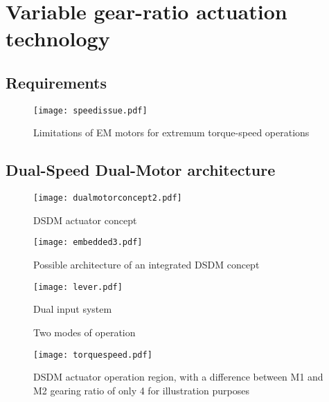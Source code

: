 \chapter{Variable gear-ratio actuation technology}
\label{sec:MultipleSpeedActuationTechnology}

\section{Requirements}
\label{sec:Requirements}

\begin{figure}[H]
	\centering
		\texttt{[image: speedissue.pdf]}
	\caption{Limitations of EM motors for extremum torque-speed operations}
	\label{fig:speedissue}
\end{figure}


\section{Dual-Speed Dual-Motor architecture}
\label{sec:DSDM}


\begin{figure}[H]
	\centering
		\texttt{[image: dualmotorconcept2.pdf]}
	\caption{DSDM actuator concept}
	\label{fig:dualmotorconcept}
\end{figure}


\begin{figure}[H]
	\centering
		\texttt{[image: embedded3.pdf]}
	\caption{Possible architecture of an integrated DSDM concept}
	\label{fig:embedded}
\end{figure}


\begin{figure}[H]
	\centering
		\texttt{[image: lever.pdf]}
	\caption{Dual input system}
	\label{fig:lever}
\end{figure}
%
\begin{figure}[H]
        \centering
        \caption{Two modes of operation}\label{fig:opmode}
\end{figure}

\begin{figure}[H]
	\centering
		\texttt{[image: torquespeed.pdf]}
	\caption{DSDM actuator operation region, with a difference between M1 and M2 gearing ratio of only 4 for illustration purposes }
	\label{fig:torquespeed}
\end{figure}



